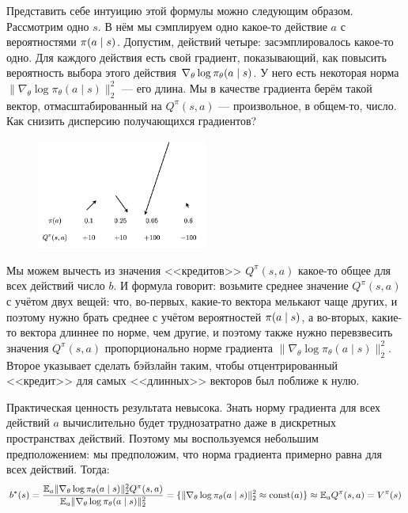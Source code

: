 \begin{example}
Представить себе интуицию этой формулы можно следующим образом. Рассмотрим одно $s$. В нём мы сэмплируем одно какое-то действие $a$ с вероятностями $\pi(a \HM \mid s)$. Допустим, действий четыре: засэмплировалось какое-то одно. Для каждого действия есть свой градиент, показывающий, как повысить вероятность выбора этого действия $\nabla_\theta \log \pi_\theta (a \HM \mid s)$. У него есть некоторая норма $\|\nabla_{\theta} \log \pi_\theta(a \mid s)\|^2_2$ --- его длина. Мы в качестве градиента берём такой вектор, отмасштабированный на $Q^\pi(s, a)$ --- произвольное, в общем-то, число. Как снизить дисперсию получающихся градиентов?

\begin{figure}
\centering
\vspace{-0.8cm}
\includegraphics[width=0.5\textwidth]{Images/BaselineIntuition.png}
\end{figure}

Мы можем вычесть из значения <<кредитов>> $Q^\pi(s, a)$ какое-то общее для всех действий число $b$. И формула говорит: возьмите среднее значение $Q^\pi(s, a)$ с учётом двух вещей: что, во-первых, какие-то вектора мелькают чаще других, и поэтому нужно брать среднее с учётом вероятностей $\pi(a \HM \mid s)$, а во-вторых, какие-то вектора длиннее по норме, чем другие, и поэтому также нужно перевзвесить значения $Q^\pi(s, a)$ пропорционально норме градиента $\|\nabla_{\theta} \log \pi_\theta(a \mid s)\|^2_2$. Второе указывает сделать бэйзлайн таким, чтобы отцентрированный <<кредит>> для самых <<длинных>> векторов был поближе к нулю. 
\end{example}

Практическая ценность результата невысока. Знать норму градиента для всех действий $a$ вычислительно будет труднозатратно даже в дискретных пространствах действий. Поэтому мы воспользуемся небольшим предположением: мы предположим, что норма градиента примерно равна для всех действий. Тогда:
$$b^*(s) = \frac{\mathbb{E}_a \|\nabla_{\theta} \log \pi_\theta(a \mid s)\|_2^2 Q^{\pi}(s, a)}{\mathbb{E}_a \|\nabla_{\theta} \log \pi_\theta(a \mid s)\|_2^2} = \{ \|\nabla_{\theta} \log \pi_\theta(a \mid s)\|_2^2 \approx \operatorname{const}(a) \} \approx \mathbb{E}_a Q^{\pi}(s, a) = V^\pi(s)$$

